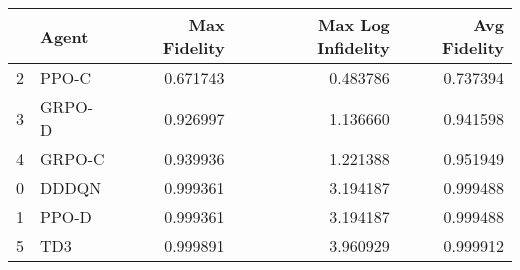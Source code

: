 \begin{tabular}{llrrr}
\toprule
 & Agent & Max Fidelity & Max Log Infidelity & Avg Fidelity \\
\midrule
2 & PPO-C & 0.671743 & 0.483786 & 0.737394 \\
3 & GRPO-D & 0.926997 & 1.136660 & 0.941598 \\
4 & GRPO-C & 0.939936 & 1.221388 & 0.951949 \\
0 & DDDQN & 0.999361 & 3.194187 & 0.999488 \\
1 & PPO-D & 0.999361 & 3.194187 & 0.999488 \\
5 & TD3 & 0.999891 & 3.960929 & 0.999912 \\
\bottomrule
\end{tabular}
